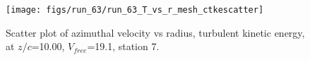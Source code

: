 \begin{figure}[H]
\centering
\texttt{[image: figs/run\_63/run\_63\_T\_vs\_r\_mesh\_ctkescatter]}
\caption{Scatter plot of azimuthal velocity vs radius, turbulent kinetic energy, at $z/c$=10.00, $V_{free}$=19.1, station 7.}
\end{figure}


